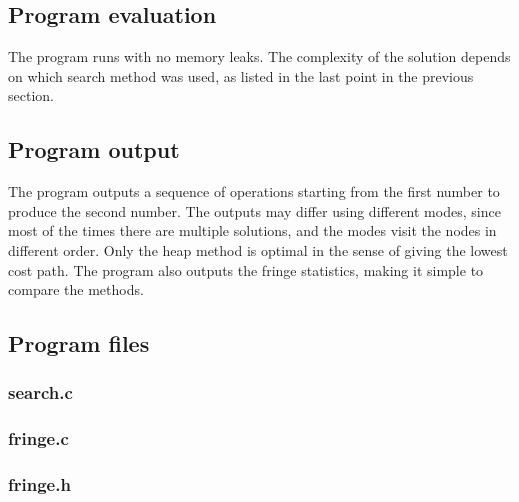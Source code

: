 \documentclass{article}
\begin{document}
\subsection*{Program evaluation}
The program runs with no memory leaks. The complexity of the solution depends on which search method was used, as listed in the last point in the previous section.

\subsection*{Program output}
The program outputs a sequence of operations starting from the first number to produce the second number. The outputs may differ using different modes, since most of the times there are multiple solutions, and the modes visit the nodes in different order. Only the heap method is optimal in the sense of giving the lowest cost path. The program also outputs the fringe statistics, making it simple to compare the methods.

\subsection*{Program files}
\subsubsection*{search.c}

\subsubsection*{fringe.c}

\subsubsection*{fringe.h}

\end{document}

